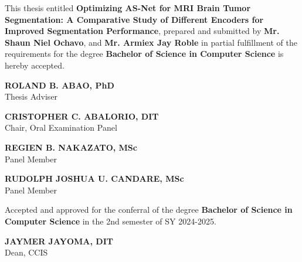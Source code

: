 \begin{approvalPage}

  This thesis entitled \textbf{Optimizing AS-Net for MRI Brain Tumor Segmentation: A Comparative Study of Different Encoders for Improved Segmentation Performance}, prepared and submitted by \textbf{Mr. Shaun Niel Ochavo}, and \textbf{Mr. Armiex Jay Roble} in partial fulfillment of the requirements for the degree \textbf{Bachelor of Science in Computer Science} is hereby accepted.

  \vspace{2cm}

  \centering

  \begin{singlespace}
    \textbf{ROLAND B. ABAO, PhD} \\
    Thesis Adviser
  \end{singlespace}

  \vspace{1.5cm}

  \begin{singlespace}
    \textbf{CRISTOPHER C. ABALORIO, DIT} \\
    Chair, Oral Examination Panel
  \end{singlespace}

  \vspace{1.5cm}

  \noindent
  \begin{minipage}[t]{0.45\textwidth}
    \centering
    \begin{singlespace}
      \textbf{REGIEN B. NAKAZATO, MSc} \\
      Panel Member
    \end{singlespace}
  \end{minipage}%
  \hfill
  \begin{minipage}[t]{0.45\textwidth}
    \centering
    \begin{singlespace}
      \textbf{RUDOLPH JOSHUA U. CANDARE, MSc} \\
      Panel Member
    \end{singlespace}
  \end{minipage}

  \vspace{2cm}

  \centering
  Accepted and approved for the conferral of the degree \textbf{Bachelor of Science in Computer Science} in the 2nd semester of SY 2024-2025.

  \vspace{1.5cm}

  \noindent
  \hfill
  \begin{minipage}[t]{0.45\textwidth}
    \centering
    \begin{singlespace}
      \textbf{JAYMER JAYOMA, DIT} \\
      Dean, CCIS
    \end{singlespace}
  \end{minipage}

  \clearpage

\end{approvalPage}